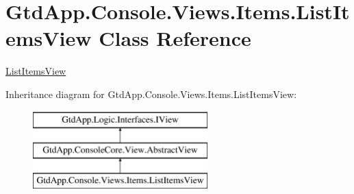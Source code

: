 \hypertarget{class_gtd_app_1_1_console_1_1_views_1_1_items_1_1_list_items_view}{}\section{Gtd\+App.\+Console.\+Views.\+Items.\+List\+Items\+View Class Reference}
\label{class_gtd_app_1_1_console_1_1_views_1_1_items_1_1_list_items_view}


\mbox{\hyperlink{class_gtd_app_1_1_console_1_1_views_1_1_items_1_1_list_items_view}{List\+Items\+View}}  


Inheritance diagram for Gtd\+App.\+Console.\+Views.\+Items.\+List\+Items\+View\+:\begin{figure}[H]
\begin{center}
\leavevmode
\includegraphics[height=3.000000cm]{class_gtd_app_1_1_console_1_1_views_1_1_items_1_1_list_items_view}
\end{center}
\end{figure}
